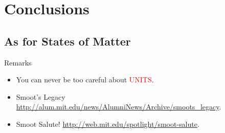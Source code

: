 \documentclass[12pt,compress]{beamer}
\begin{document}
\section{Conclusions}

\subsection{As for States of Matter}
\begin{frame}{Remarks}
	\begin{itemize}
		\item You can never be too careful about \textcolor{red}{UNITS}.
		\item Smoot's Legacy \url{http://alum.mit.edu/news/AlumniNews/Archive/smoots_legacy}.
		\item Smoot Salute! \url{http://web.mit.edu/spotlight/smoot-salute}.
	\end{itemize}
\end{frame}

\end{document}
